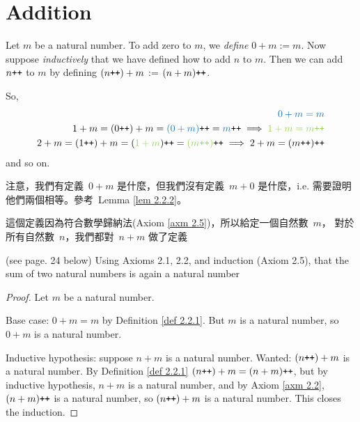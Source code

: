 \section{Addition}\label{sec 2.2}

\newcommand{\BLUE}[1]{\textcolor{RoyalBlue}{#1}}
\newcommand{\GREEN}[1]{\textcolor{YellowGreen}{#1}}
\newcommand{\MAROON}[1]{\textcolor{Maroon}{#1}}

\begin{definition}  \label{def 2.2.1} Let \(m\) be a natural number. To add zero to \(m\), we \emph{define} \(0 + m := m\). Now suppose \emph{inductively} that we have defined how to add \(n\) to \(m\). Then we can add \(n\texttt{++} \) to \(m\) by defining \((n\texttt{++}) + m\) := \((n + m)\texttt{++}\).
\end{definition}
\begin{note}
So,
\begin{align*}
\BLUE{0 + m = m}\\
1 + m = (0\INC) + m = \BLUE{(0 + m)}\INC = \BLUE{m}\INC \implies \GREEN{1 + m = m\INC} \\
2 + m = (1\INC) + m = (\GREEN{1 + m})\INC = \GREEN{(m\INC)}\INC \implies 2 + m = (m\INC)\INC
\end{align*}
and so on.
\end{note}
\begin{note}
注意，我們有定義\ \(0 + m\) 是什麼，但我們沒有定義\ \(m + 0\) 是什麼，i.e. 需要證明他們兩個相等。參考\ Lemma \ref{lem 2.2.2}。
\end{note}
\begin{note}
這個定義因為符合數學歸納法(Axiom \ref{axm 2.5})，所以給定一個自然數\ \(m\)， 對於所有自然數\ \(n\)，我們都對\ \(n + m\) 做了定義
\end{note}

\begin{additional corollary}\label{ac 2.2.1} (see page. 24 below) Using Axioms 2.1, 2.2, and induction (Axiom 2.5), that the sum of two natural numbers is again a natural number 
\end{additional corollary}
\begin{proof}
Let \(m\) be a natural number.

Base case: \(0 + m = m\) by Definition \ref{def 2.2.1}. But \(m\) is a natural number, so \(0 + m\) is a natural number. 

Inductive hypothesis: suppose \(n + m\) is a natural number. Wanted: \((n\texttt{++}) + m\) is a natural number. By Definition \ref{def 2.2.1} \BLUE{\((n\texttt{++}) + m = (n + m)\texttt{++}\)}, but by inductive hypothesis, \(n + m\) is a natural number, and by Axiom \ref{axm 2.2}, \BLUE{\((n + m)\texttt{++}\)} is a natural number, so \BLUE{\((n\texttt{++}) + m\)} is a natural number. This closes the induction.
\end{proof}


